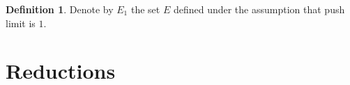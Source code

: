 \documentclass[12pt]{article}
\newtheorem{lemma}{Lemma}
\theoremstyle{remark}
\newtheorem{remark}{Remark}
\theoremstyle{definition}
\newtheorem{definition}{Definition}
\begin{document}




\begin{definition}
    Denote by $E_1$ the set $E$ defined under the assumption that push limit is $1$.
\end{definition}



\section{Reductions}
\end{document}
